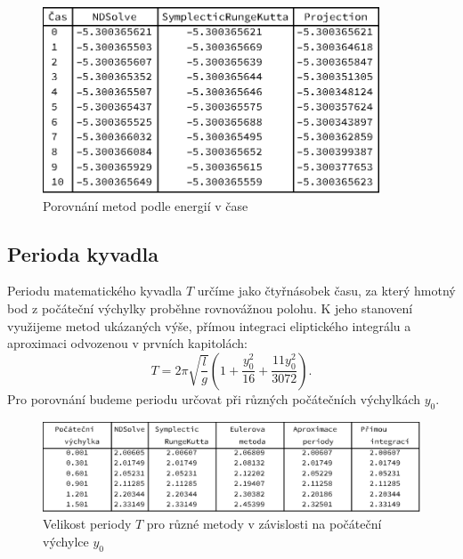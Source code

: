 \begin{description}
\begin{figure}[h]
  \centering
  \includegraphics[width=10cm]{figures/TAB1.eps}
  \caption{Porovnání metod podle energií v čase}
  \label{fig:tab}
\end{figure}



\end{description}

\subsection{Perioda kyvadla}
\label{sec:Perioda}

Periodu matematického kyvadla $T$ určíme jako čtyřnásobek času, za který hmotný bod z počáteční výchylky proběhne rovnovážnou polohu. K jeho stanovení využijeme metod ukázaných výše, přímou integraci eliptického integrálu a aproximaci odvozenou v prvních kapitolách:
\begin{equation}
\label{aproxperiod}
T= 2 \pi \sqrt{\frac{l}{g}} \left( 1 + \frac{y_{0}^{2}}{16} + \frac{11y_{0}^{2}}{3072} \right) .
\end{equation}
Pro porovnání budeme periodu určovat při různých počátečních výchylkách $y_{0}$.

\begin{figure}[h]
  \centering
  \includegraphics[width=15cm]{figures/PER-TAB.eps}
  \caption{Velikost periody $T$ pro různé metody v závislosti na počáteční výchylce $y_{0}$}
  \label{fig:pertab}
\end{figure}

